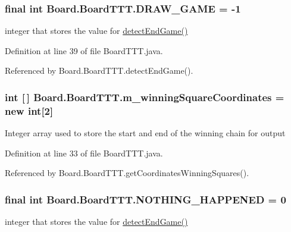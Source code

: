 \subsubsection[{D\+R\+A\+W\+\_\+\+G\+A\+M\+E}]{\setlength{\rightskip}{0pt plus 5cm}final int Board.\+Board\+T\+T\+T.\+D\+R\+A\+W\+\_\+\+G\+A\+M\+E = -\/1\hspace{0.3cm}{\ttfamily [static]}}\label{class_board_1_1_board_t_t_t_a16be9cbe57d43388a3fa6e5b706210e5}
integer that stores the value for \hyperlink{class_board_1_1_board_t_t_t_a08f36da4210111d8f129be28a550334e}{detect\+End\+Game()} 

Definition at line 39 of file Board\+T\+T\+T.\+java.



Referenced by Board.\+Board\+T\+T\+T.\+detect\+End\+Game().

\hypertarget{class_board_1_1_board_t_t_t_a50bc789f0168c29495d4827cca10c89f}{}
\subsubsection[{m\+\_\+winning\+Square\+Coordinates}]{\setlength{\rightskip}{0pt plus 5cm}int \mbox{[}$\,$\mbox{]} Board.\+Board\+T\+T\+T.\+m\+\_\+winning\+Square\+Coordinates = new int\mbox{[}2\mbox{]}\hspace{0.3cm}{\ttfamily [private]}}\label{class_board_1_1_board_t_t_t_a50bc789f0168c29495d4827cca10c89f}
Integer array used to store the start and end of the winning chain for output 

Definition at line 33 of file Board\+T\+T\+T.\+java.



Referenced by Board.\+Board\+T\+T\+T.\+get\+Coordinates\+Winning\+Squares().

\hypertarget{class_board_1_1_board_t_t_t_a5448324216e6a32d3264e50779962562}{}
\subsubsection[{N\+O\+T\+H\+I\+N\+G\+\_\+\+H\+A\+P\+P\+E\+N\+E\+D}]{\setlength{\rightskip}{0pt plus 5cm}final int Board.\+Board\+T\+T\+T.\+N\+O\+T\+H\+I\+N\+G\+\_\+\+H\+A\+P\+P\+E\+N\+E\+D = 0\hspace{0.3cm}{\ttfamily [static]}}\label{class_board_1_1_board_t_t_t_a5448324216e6a32d3264e50779962562}
integer that stores the value for \hyperlink{class_board_1_1_board_t_t_t_a08f36da4210111d8f129be28a550334e}{detect\+End\+Game()} 

